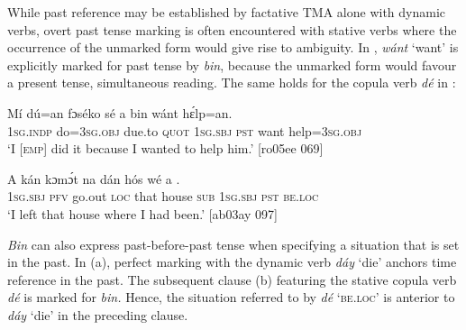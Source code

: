 While past reference may be established by factative TMA alone with dynamic verbs, overt past tense marking is often encountered with stative verbs where the occurrence of the unmarked form would give rise to ambiguity. In , \textit{wánt} ‘want’ is explicitly marked for past tense by \textit{bin}, because the unmarked form would favour a present tense, simultaneous reading. The same holds for the copula verb \textit{dé} in : 



\ea%
    \label{ex:key:382}
    \gll Mí    dú=an    fɔséko  sé    a    bin  wánt  hɛ́lp=an.\\
\textsc{1sg.indp}  do=\textsc{3sg.obj}  due.to  \textsc{quot}    \textsc{1sg.sbj}  \textsc{pst}  want  help=\textsc{3sg.obj}\\

\glt ‘I \textsc{[emp]} did it because I wanted to help him.’ [ro05ee 069]
\z


\ea%
    \label{ex:key:383}
    \gll \MakeUppercase{A}   kán  kɔmɔ́t  na  dán    hós    wé  a     .\\
\textsc{1sg.sbj}  \textsc{pfv}  go.out  \textsc{loc}  that    house  \textsc{sub}  \textsc{1sg.sbj}  \textsc{pst}  \textsc{be.loc}\\

\glt ‘I left that house where I had been.’ [ab03ay 097]
\z

\textit{Bin} can also express past-before-past tense when specifying a situation that is set in the past. In (a), perfect marking with the dynamic verb \textit{dáy} ‘die’ anchors time reference in the past. The subsequent clause (b) featuring the stative copula verb \textit{dé} is marked for \textit{bin.} Hence, the situation referred to by \textit{dé} \textsc{‘be.loc’} is anterior to \textit{dáy} ‘die’ in the preceding clause. 


\ea%
    \label{ex:key:384}
\z
\z

